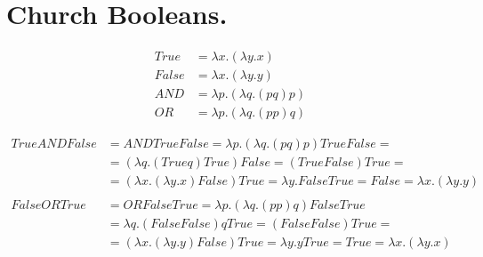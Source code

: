 \section{ Church Booleans. }

\begin{align*} 
 True &= λx.(λy.x)     \\
False &= λx.(λy.y)     \\
  AND &= λp.(λq.(pq)p) \\
   OR &= λp.(λq.(pp)q) 
\end{align*}


\begin{align*} 
True AND False &= AND True False = λp.(λq.(pq)p) True False = \\
               &= (λq.(True q) True) False = (True False) True = \\ 
               &= (λx.(λy.x) False) True = λy.False True = False = λx.(λy.y) \\
\\
False OR True  &= OR False True = λp.(λq.(pp)q) False True  \\
               &= λq.(False False)q True = (False False) True = \\
               &= (λx.(λy.y) False) True = λy.y True = True = λx.(λy.x)
\end{align*} 
